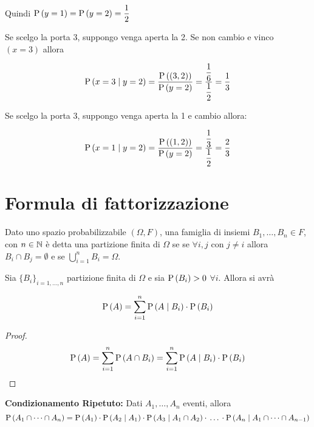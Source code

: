 Quindi $ \text{P}\left(y=1\right) = \text{P}\left(y=2\right) = \dfrac{1}{2} $

Se scelgo la porta 3, suppongo venga aperta la 2. Se non cambio e vinco $ (x = 3) $ allora

\begin{equation*}
	\text{P}\left(x=3  \mid  y=2\right) = \dfrac{\text{P}\left((3,2)\right)}{\text{P}\left(y=2\right)} = \dfrac{\dfrac{1}{6}}{\dfrac{1}{2}} = \dfrac{1}{3}
\end{equation*}


Se scelgo la porta 3, suppongo venga aperta la 1 e cambio allora:

\begin{equation}
	\text{P}\left(x=1  \mid  y=2\right) = \dfrac{\text{P}\left((1,2)\right)}{\text{P}\left(y=2\right)} = \dfrac{\dfrac{1}{3}}{\dfrac{1}{2}} = \dfrac{2}{3}
\end{equation}

\section{Formula di fattorizzazione}

\begin{defn}
	Dato uno spazio probabilizzabile $(\Omega, F)$,
	una famiglia di insiemi $ B_1, \dots, B_n \in F$, con $ n \in \mathbb{N} $  \`e detta una partizione finita di $ \Omega $ se  se $ \forall i,j$ con  $j\neq i$ allora  $B_i \cap B_j = \emptyset $ e se
	$ \bigcup_{i=1}^{n} B_i = \Omega $.
	\end{defn}

\begin{lem}
	Sia $ \{B_i\}_{i=1, \dots, n} $ partizione finita di $ \Omega $ e sia $ \text{P}\left(B_i\right) > 0 $ $\forall i$. Allora si avr\`a


	\begin{equation}
		\text{P}\left(A\right) = \sum_{i=1}^{n} \text{P}\left(A \mid B_i\right) \cdot \text{P}\left(B_i\right)
	\end{equation}
	
	\begin{proof}
		\begin{equation*}
			\text{P}\left(A\right) =  \sum_{i=1}^{n} \text{P}\left(A \cap B_i\right) = \sum_{i=1}^{n} \text{P}\left(A \mid B_i\right) \cdot \text{P}\left(B_i\right)
		\end{equation*}
	\end{proof}
\end{lem}

\begin{defn}
	\textbf{Condizionamento Ripetuto:}
	Dati $ A_1, \dots, A_n $ eventi, allora 
	\begin{equation*}
		\text{P}\left(A_1 \cap \dots \cap A_n\right) = \text{P}\left(A_1\right) \cdot \text{P}\left(A_2 \mid A_1\right) \cdot \text{P}\left(A_3 \mid  A_1 \cap A_2\right) \cdot\, \dots\, \cdot \text{P}\left(A_n  \mid  A_1 \cap \dots \cap A_{n-1}\right)
	\end{equation*}
\end{defn}


